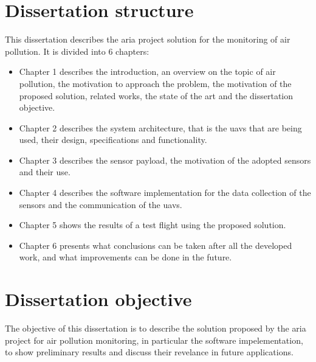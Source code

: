 \section{Dissertation structure}
This dissertation describes the \gls{aria} project solution for the monitoring of air pollution. It is divided into 6 chapters:
\begin{itemize}
    \item Chapter 1 describes the introduction, an overview on the topic of air pollution, the motivation to approach the problem, the motivation of the proposed solution, related works, the state of the art and the dissertation objective.
    \item Chapter 2 describes the system architecture, that is the \gls{uavs} that are being used, their design, specifications and functionality.
    \item Chapter 3 describes the sensor payload, the motivation of the adopted sensors and their use.
    \item Chapter 4 describes the software implementation for the data collection of the sensors and the communication of the \gls{uavs}.
    \item Chapter 5 shows the results of a test flight using the proposed solution.
    \item Chapter 6 presents what conclusions can be taken after all the developed work, and what improvements can be done in the future.
\end{itemize}
\section{Dissertation objective}
The objective of this dissertation is to describe the solution proposed by the \gls{aria} project for air pollution monitoring, in particular the software impelementation, to show preliminary results and discuss their revelance in future applications.